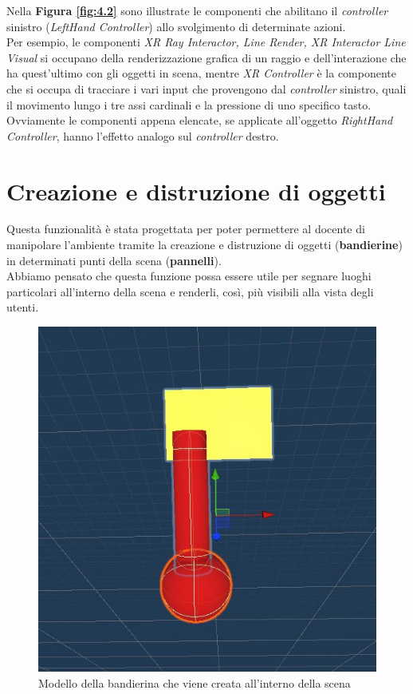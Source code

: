 Nella \textbf{Figura \ref{fig:4.2}} sono illustrate le componenti che abilitano il \textit{controller} sinistro (\textit{LeftHand Controller}) allo svolgimento di determinate azioni.
\\Per esempio, le componenti \textit{XR Ray Interactor, Line Render, XR Interactor Line Visual} si occupano della renderizzazione grafica di un raggio e dell'interazione che ha quest'ultimo con gli oggetti in scena, mentre \textit{XR Controller} è la componente che si occupa di tracciare i vari input che provengono dal \textit{controller} sinistro, quali il movimento lungo i tre assi cardinali e la pressione di uno specifico tasto.
\\Ovviamente le componenti appena elencate, se applicate all'oggetto \textit{RightHand Controller}, hanno l'effetto analogo sul \textit{controller} destro.
\section{Creazione e distruzione di oggetti}
Questa funzionalità è stata progettata per poter permettere al docente di manipolare l'ambiente tramite la creazione e distruzione di oggetti (\textbf{bandierine}) in determinati punti della scena (\textbf{pannelli}).
\\Abbiamo pensato che questa funzione possa essere utile per segnare luoghi particolari all'interno della scena e renderli, così, più visibili alla vista degli utenti.
\begin{figure}[H]
    \centering
    \includegraphics[scale = 0.4]{Immagini/bandierina.jpg}
    \caption{Modello della bandierina che viene creata all'interno della scena}
    \label{fig:my_label}
\end{figure}

